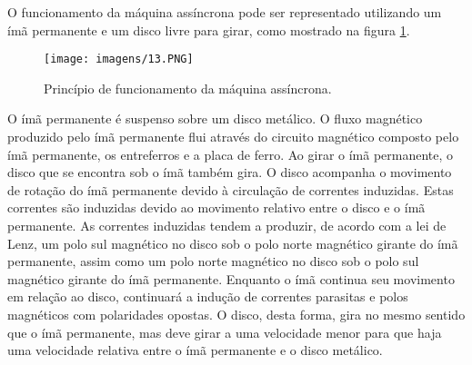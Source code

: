 O funcionamento da máquina assíncrona pode ser representado utilizando um ímã permanente e um disco livre para girar, como mostrado na figura \ref{fig:13}.

\begin{figure}[ht!]
\center 
\texttt{[image: imagens/13.PNG]}
\caption{Princípio de funcionamento da máquina assíncrona.}\label{fig:13}
\end{figure}

O ímã permanente é suspenso sobre um disco metálico. O fluxo magnético produzido pelo ímã permanente flui através do circuito magnético composto pelo ímã permanente, os entreferros e a placa de ferro. Ao girar o ímã permanente, o disco que se encontra sob o ímã também gira. O disco acompanha o movimento de rotação do ímã permanente devido à circulação de correntes induzidas. Estas correntes são induzidas devido ao movimento relativo entre o disco e o ímã permanente. As correntes induzidas tendem a produzir, de acordo com a lei de Lenz, um polo sul magnético no disco sob o polo norte magnético girante do ímã permanente, assim como um polo norte magnético no disco sob o polo sul magnético girante do ímã permanente. Enquanto o ímã continua seu movimento em relação ao disco, continuará a indução de correntes parasitas e polos magnéticos com polaridades opostas. O disco, desta forma, gira no mesmo sentido que o ímã permanente, mas deve girar a uma velocidade menor para que haja uma velocidade relativa entre o ímã permanente e o disco metálico.

